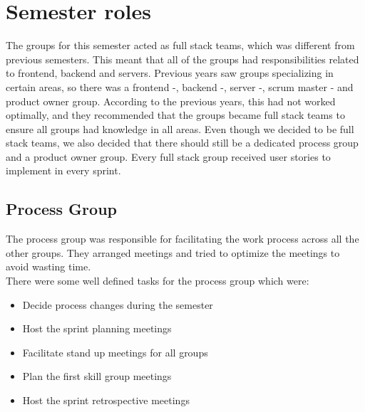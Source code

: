 \section{Semester roles}\label{sec:semesterRoles}
The groups for this semester acted as full stack teams, which was different from previous semesters. 
This meant that all of the groups had responsibilities related to frontend, backend and servers.
Previous years saw groups specializing in certain areas, so there was a frontend -, backend -, server -, scrum master - and product owner group. 
According to the previous years, this had not worked optimally, and they recommended that the groups became full stack teams to ensure all groups had knowledge in all areas.
Even though we decided to be full stack teams, we also decided that there should still be a dedicated process group and a product owner group. 
Every full stack group received user stories to implement in every sprint.

\subsection{Process Group}
The process group was responsible for facilitating the work process across all the other groups.
They arranged meetings and tried to optimize the meetings to avoid wasting time.
\\
There were some well defined tasks for the process group which were:
\begin{itemize}
    \item Decide process changes during the semester
    \item Host the sprint planning meetings
    \item Facilitate stand up meetings for all groups
    \item Plan the first skill group meetings
    \item Host the sprint retrospective meetings
\end{itemize}

